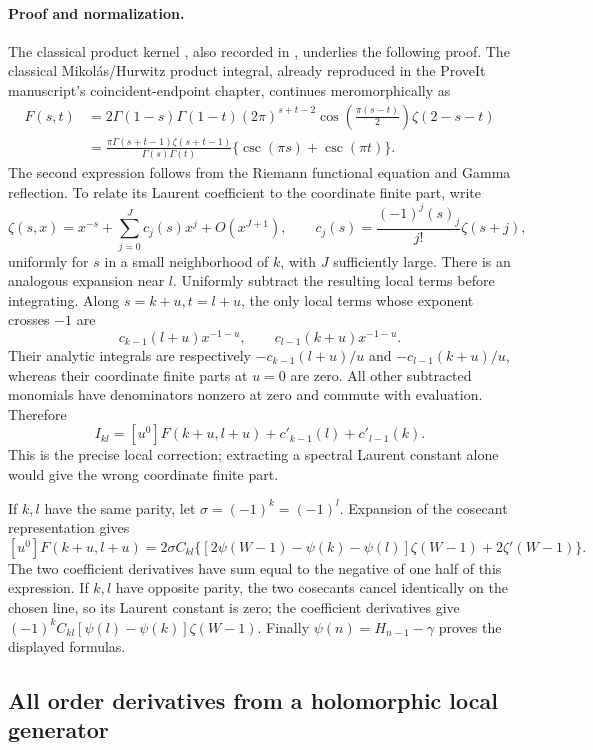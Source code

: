 \documentclass[11pt,a4paper]{article}
\numberwithin{equation}{section}
\theoremstyle{definition}
\theoremstyle{remark}
\begin{document}
\paragraph{Proof and normalization.}
The classical product kernel \cite[Remark~1]{Shpot2016}, also recorded in \cite[Chapter~7]{SourceManuscript}, underlies the following proof.
The classical Mikol\'as/Hurwitz product integral, already reproduced
in the ProveIt manuscript's coincident-endpoint chapter, continues
meromorphically as
\begin{align*}
 F(s,t)&=2\Gamma(1-s)\Gamma(1-t)(2\pi)^{s+t-2}
 \cos\!\left(\frac{\pi(s-t)}2\right)\zeta(2-s-t)\\
 &=\frac{\pi\Gamma(s+t-1)\zeta(s+t-1)}{\Gamma(s)\Gamma(t)}
   \{\csc(\pi s)+\csc(\pi t)\}.
\end{align*}
The second expression follows from the Riemann functional equation and
Gamma reflection.  To relate its Laurent coefficient to the coordinate
finite part, write
\[
 \zeta(s,x)=x^{-s}+\sum_{j=0}^{J}c_j(s)x^j+O(x^{J+1}),
 \qquad c_j(s)=\frac{(-1)^j(s)_j}{j!}\zeta(s+j),
\]
uniformly for $s$ in a small neighborhood of $k$, with $J$ sufficiently
large.  There is an analogous expansion near $l$.  Uniformly subtract
the resulting local terms before integrating.  Along
$s=k+u,t=l+u$, the only local terms whose exponent crosses $-1$ are
\[
 c_{k-1}(l+u)x^{-1-u},\qquad
 c_{l-1}(k+u)x^{-1-u}.
\]
Their analytic integrals are respectively
$-c_{k-1}(l+u)/u$ and $-c_{l-1}(k+u)/u$, whereas their coordinate
finite parts at $u=0$ are zero.  All other subtracted monomials have
denominators nonzero at zero and commute with evaluation.  Therefore
\[
 I_{kl}=[u^0]F(k+u,l+u)
       +c'_{k-1}(l)+c'_{l-1}(k).
\]
This is the precise local correction; extracting a spectral Laurent
constant alone would give the wrong coordinate finite part.

If $k,l$ have the same parity, let $\sigma=(-1)^k=(-1)^l$.
Expansion of the cosecant representation gives
\[
 [u^0]F(k+u,l+u)
 =2\sigma C_{kl}\{[2\psi(W-1)-\psi(k)-\psi(l)]\zeta(W-1)
                   +2\zeta'(W-1)\}.
\]
The two coefficient derivatives have sum equal to the negative of one
half of this expression.  If $k,l$ have opposite parity, the two
cosecants cancel identically on the chosen line, so its Laurent
constant is zero; the coefficient derivatives give
$(-1)^kC_{kl}[\psi(l)-\psi(k)]\zeta(W-1)$.  Finally
$\psi(n)=H_{n-1}-\gamma$ proves the displayed formulas.

\subsection{All order derivatives from a holomorphic local generator}
\end{document}
